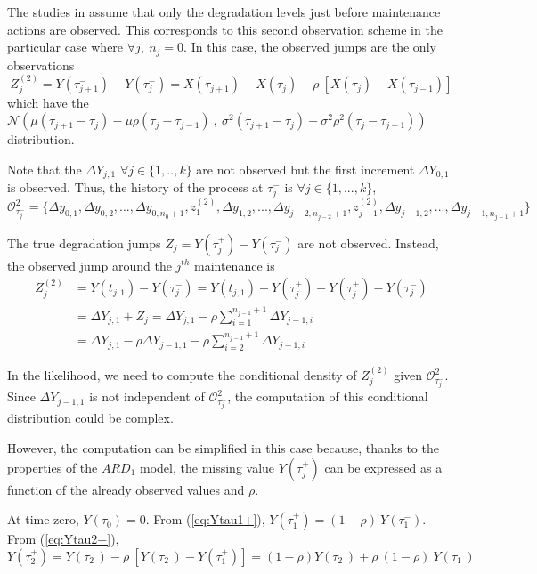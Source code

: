 The studies in \cite{salles_semiparametric_2020, kamranfar_inference_2021} assume that only the degradation levels just before maintenance actions are observed. This corresponds to this second observation scheme in the particular case where $\forall j,\ n_j=0$.
In this case, the observed jumps are the only observations 
$$Z_j^{(2)} = Y(\tau_{j+1}^-) - Y(\tau_{j}^-) = X(\tau_{j+1})- X(\tau_j)-\rho\ \left[  X(\tau_j) - X(\tau_{j-1}) \right]$$
\noindent which have the $\mathcal{N}\left(\mu  (\tau_{j+1} - \tau_{j})- \mu \rho (\tau_j - \tau_{j-1})\ ,\ \sigma^2 (\tau_{j+1} - \tau_{j}) + \sigma^2 \rho^2 (\tau_j - \tau_{j-1})\right)$ distribution.

\noindent Note that the $\Delta Y_{j,1}$ $\forall j \in \{1,..,k\}$ are not observed but the first increment $\Delta Y_{0,1}$ is observed. Thus, the history of the process at $\tau_j^-$ is
$\forall j \in \{1,...,k\}$,\\
$\mathcal{O}_{\tau_j^-}^2=\{\Delta y_{0,1}, \Delta y_{0,2},...,\Delta y_{0,n_0+1},z_{1}^{(2)},\Delta y_{1,2},...,\Delta y_{j-2,n_{j-2}+1},z_{j-1}^{(2)}, \Delta y_{j-1,2},...,\Delta y_{j-1,n_{j-1}+1}\}\ $ 

\noindent The true degradation jumps $Z_j = Y(\tau_{j}^+) - Y(\tau_{j}^-)$ are not observed.
Instead, the observed jump around the $j^{th}$ maintenance is 
\begin{align}
Z_j^{(2)}&= Y(t_{j,1})-Y(\tau_j^-) = Y(t_{j,1})-Y(\tau_j^+)+Y(\tau_j^+)-Y(\tau_j^-) \nonumber \\
&= \Delta Y_{j,1}+Z_j = \Delta Y_{j,1}-\rho \sum\limits_{i=1}^{n_{j-1}+1} \Delta Y_{j-1,i} \nonumber \\
&= \Delta Y_{j,1} -\rho \Delta Y_{j-1,1} -\rho \sum\limits_{i=2}^{n_{j-1}+1} \Delta Y_{j-1,i} \label{eq:Zj21}
\end{align}

In the likelihood, we need to compute the conditional density of $Z_j^{(2)}$ given $\mathcal{O}_{\tau_j^-}^2$. Since $\Delta Y_{j-1,1}$ is not independent of $\mathcal{O}_{\tau_j^-}^2$, the computation of this conditional distribution could be complex.

\noindent However, the computation can be simplified in this case because, thanks to the properties of the $ARD_1$ model, the missing value $Y(\tau_j^+)$ can be expressed as a function of the already observed values and $\rho$.

\noindent At time zero, $Y(\tau_0)=0$. From (\ref{eq:Ytau1+}), $Y(\tau_1^+) = (1-\rho)\ Y(\tau_1^-)$. From (\ref{eq:Ytau2+}), 
$$Y(\tau_2^+)= Y(\tau_2^-)-\rho\ \left[ Y(\tau_2^-)-Y(\tau_1^+)\right]= (1-\rho) Y(\tau_2^-)+\rho\ (1-\rho)\ Y(\tau_1^-)$$

